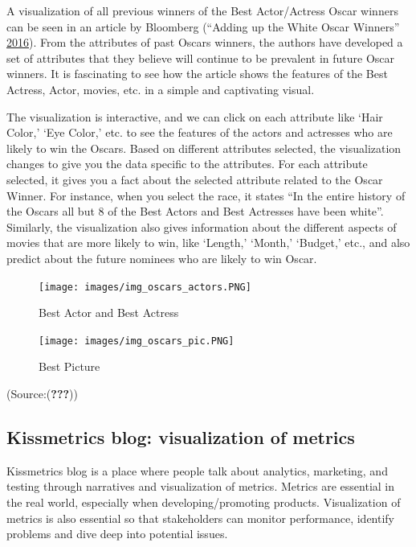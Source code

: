 \documentclass[]{book}
\begin{document}
A visualization of all previous winners of the Best Actor/Actress Oscar winners can be seen in an article by Bloomberg (``Adding up the White Oscar Winners'' \protect\hyperlink{ref-adding_oscars}{2016}). From the attributes of past Oscars winners, the authors have developed a set of attributes that they believe will continue to be prevalent in future Oscar winners. It is fascinating to see how the article shows the features of the Best Actress, Actor, movies, etc. in a simple and captivating visual.

The visualization is interactive, and we can click on each attribute like `Hair Color,' `Eye Color,' etc. to see the features of the actors and actresses who are likely to win the Oscars. Based on different attributes selected, the visualization changes to give you the data specific to the attributes. For each attribute selected, it gives you a fact about the selected attribute related to the Oscar Winner. For instance, when you select the race, it states ``In the entire history of the Oscars all but 8 of the Best Actors and Best Actresses have been white''. Similarly, the visualization also gives information about the different aspects of movies that are more likely to win, like `Length,' `Month,' `Budget,' etc., and also predict about the future nominees who are likely to win Oscar.

\begin{figure}
\centering
\texttt{[image: images/img\_oscars\_actors.PNG]}
\caption{Best Actor and Best Actress}
\end{figure}

\begin{figure}
\centering
\texttt{[image: images/img\_oscars\_pic.PNG]}
\caption{Best Picture}
\end{figure}

(Source:({\textbf{???}}))

\hypertarget{kissmetrics-blog-visualization-of-metrics}{%
\subsection{Kissmetrics blog: visualization of metrics}\label{kissmetrics-blog-visualization-of-metrics}}

Kissmetrics blog is a place where people talk about analytics, marketing, and testing through narratives and visualization of metrics. Metrics are essential in the real world, especially when developing/promoting products. Visualization of metrics is also essential so that stakeholders can monitor performance, identify problems and dive deep into potential issues.
\end{document}
